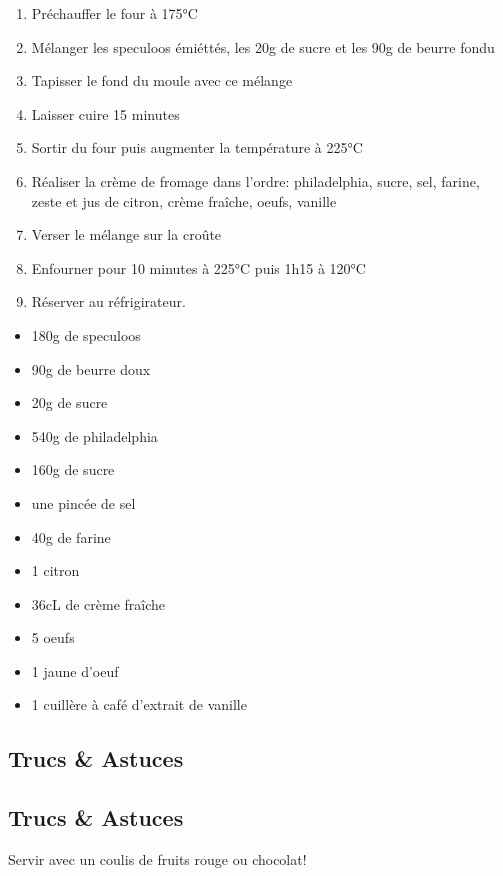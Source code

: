     \begin{minipage}{.7\textwidth}
        \begin{enumerate}
            \item Préchauffer le four à 175°C
	    \item Mélanger les speculoos émiéttés, les 20g de sucre et les 90g de beurre fondu
	    \item Tapisser le fond du moule avec ce mélange
	    \item Laisser cuire 15 minutes
	    \item Sortir du four puis augmenter la température à 225°C
	    \item Réaliser la crème de fromage dans l'ordre: philadelphia, sucre, sel, farine, zeste et jus de citron, crème fraîche, oeufs, vanille
	    \item Verser le mélange sur la croûte
	    \item Enfourner pour 10 minutes à 225°C puis 1h15 à 120°C
	    \item Réserver au réfrigirateur.

        \end{enumerate}
    \end{minipage}
    \begin{minipage}{.3\textwidth}
        \begin{flushleft}
        \begin{itemize}
            \item 180g de speculoos
	    \item 90g de beurre doux
	    \item 20g de sucre
	    \item 540g de philadelphia
	    \item 160g de sucre
	    \item une pincée de sel
	    \item 40g de farine
	    \item 1 citron
	    \item 36cL de crème fraîche
	    \item 5 oeufs
	    \item 1 jaune d'oeuf
	    \item 1 cuillère à café d'extrait de vanille

        \end{itemize}
        \end{flushleft}
    \end{minipage}
    
    \vspace{1cm}
    \hline
    \vspace{1cm}
    
    \subsection{Trucs \& Astuces}
        \subsection{Trucs \& Astuces}
	Servir avec un coulis de fruits rouge ou chocolat!
